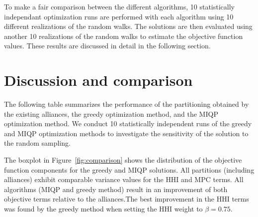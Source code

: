 \documentclass[preprint,times]{elsarticle}
\begin{document}
To make a fair comparison between the different algorithms, 10 statistically independant optimization runs are performed with each algorithm using 10 different realizations of the random walks. The solutions are then evaluated using another 10 realizations of the random walks to estimate the objective function values. These results are discussed in detail in the following section.

\section{Discussion and comparison} \label{sec:discussion}

The following table summarizes the performance of the partitioning obtained by the existing alliances, the greedy optimization method, and the \ac{MIQP} optimization method. We conduct 10 statistically independent runs of the greedy and \ac{MIQP} optimization methods to investigate the sensitivity of the solution to the random sampling. 

The boxplot in Figure~\ref{fig:comparison} shows the distribution of the objective function components for the greedy and \ac{MIQP} solutions. All partitions (including alliances) exhibit comparable variance values for the \ac{HHI} and \ac{MPC} terms. All algorithms (\ac{MIQP} and greedy method) result in an improvement of both objective terms relative to the alliances.The best improvement in the \ac{HHI} terms was found by the greedy method when setting the \ac{HHI} weight to $\beta=0.75$.
\end{document}

